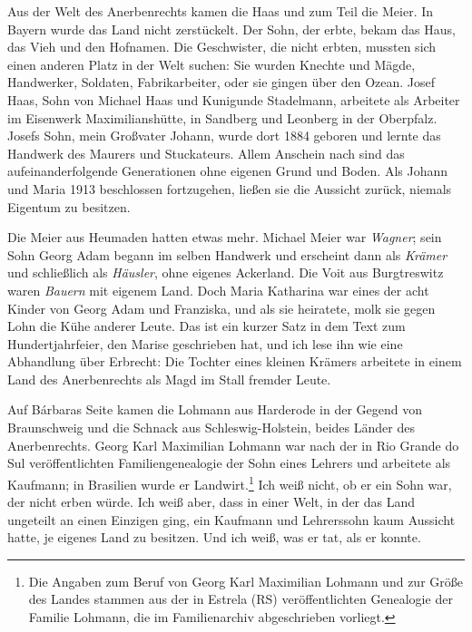 \documentclass[
  ngerman,
  11pt,
  openany]{book}
\begin{document}
Aus der Welt des Anerbenrechts kamen die Haas und zum Teil die Meier. In
Bayern wurde das Land nicht zerstückelt. Der Sohn, der erbte, bekam das
Haus, das Vieh und den Hofnamen. Die Geschwister, die nicht erbten,
mussten sich einen anderen Platz in der Welt suchen: Sie wurden Knechte
und Mägde, Handwerker, Soldaten, Fabrikarbeiter, oder sie gingen über
den Ozean. Josef Haas, Sohn von Michael Haas und Kunigunde Stadelmann,
arbeitete als Arbeiter im Eisenwerk Maximilianshütte, in Sandberg und
Leonberg in der Oberpfalz. Josefs Sohn, mein Großvater Johann, wurde
dort 1884 geboren und lernte das Handwerk des Maurers und Stuckateurs.
Allem Anschein nach sind das aufeinanderfolgende Generationen ohne
eigenen Grund und Boden. Als Johann und Maria 1913 beschlossen
fortzugehen, ließen sie die Aussicht zurück, niemals Eigentum zu
besitzen.

Die Meier aus Heumaden hatten etwas mehr. Michael Meier war
\emph{Wagner}; sein Sohn Georg Adam begann im selben Handwerk und
erscheint dann als \emph{Krämer} und schließlich als \emph{Häusler},
ohne eigenes Ackerland. Die Voit aus Burgtreswitz waren \emph{Bauern}
mit eigenem Land. Doch Maria Katharina war eines der acht Kinder von
Georg Adam und Franziska, und als sie heiratete, molk sie gegen Lohn die
Kühe anderer Leute. Das ist ein kurzer Satz in dem Text zum
Hundertjahrfeier, den Marise geschrieben hat, und ich lese ihn wie eine
Abhandlung über Erbrecht: Die Tochter eines kleinen Krämers arbeitete in
einem Land des Anerbenrechts als Magd im Stall fremder Leute.

Auf Bárbaras Seite kamen die Lohmann aus Harderode in der Gegend von
Braunschweig und die Schnack aus Schleswig-Holstein, beides Länder des
Anerbenrechts. Georg Karl Maximilian Lohmann war nach der in Rio Grande
do Sul veröffentlichten Familiengenealogie der Sohn eines Lehrers und
arbeitete als Kaufmann; in Brasilien wurde er Landwirt.\footnote{Die
  Angaben zum Beruf von Georg Karl Maximilian Lohmann und zur Größe des
  Landes stammen aus der in Estrela (RS) veröffentlichten Genealogie der
  Familie Lohmann, die im Familienarchiv abgeschrieben vorliegt.} Ich
weiß nicht, ob er ein Sohn war, der nicht erben würde. Ich weiß aber,
dass in einer Welt, in der das Land ungeteilt an einen Einzigen ging,
ein Kaufmann und Lehrerssohn kaum Aussicht hatte, je eigenes Land zu
besitzen. Und ich weiß, was er tat, als er konnte.
\end{document}
